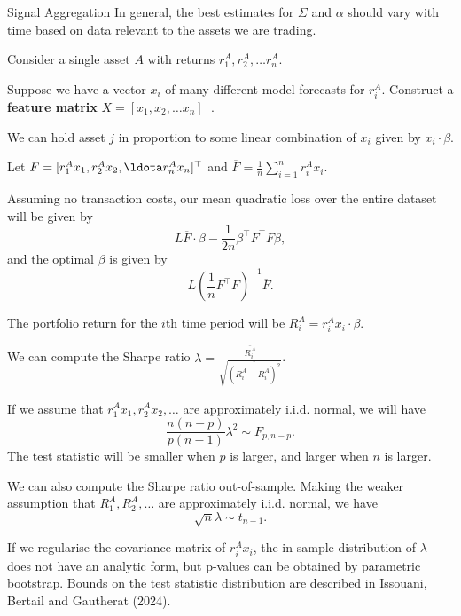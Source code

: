 \documentclass{beamer}
\begin{document}
\begin{frame}{Signal Aggregation}
	In general, the best estimates for $\Sigma$ and $\alpha$ should vary with time based on data relevant to the assets we are trading.

	Consider a single asset $A$ with returns $r_1^A,r_2^A,\ldots r_n^A$.

	Suppose we have a vector $x_i$ of many different model forecasts for $r_i^A$. Construct a \textbf{feature matrix} $X = [x_1,x_2,\ldots x_n]^\top$.

	We can hold asset $j$ in proportion to some linear combination of $x_i$ given by $x_i\cdot\beta$.

	Let $F=[r_1^A x_1, r_2^A x_2,\ldota r_n^A x_n]^\top$ and $\overline{F} = \frac{1}{n} \sum_{i=1}^n r_i^A x_i$.

	Assuming no transaction costs, our mean quadratic loss over the entire dataset will be given by
	$$L \overline{F} \cdot \beta - \frac{1}{2n}\beta^\top F^\top F\beta,$$
	and the optimal $\beta$ is given by
	$$L\left(\frac{1}{n}F^\top F\right)^{-1}\overline{F}.$$

	The portfolio return for the $i$th time period will be $R_i^A = r_i^A x_i \cdot \beta$.

	We can compute the Sharpe ratio $\lambda = \frac{\overline{R_i^A}}{\sqrt{\overline{(R_i^A - \overline{R_i^A})^2}}}$.

	If we assume that $r_1^A x_1,r_2^A x_2,\ldots$ are approximately i.i.d. normal, we will have
	$$\frac{n(n-p)}{p(n-1)}\lambda^2 \sim F_{p,n-p}.$$
	The test statistic will be smaller when $p$ is larger, and larger when $n$ is larger.%

	We can also compute the Sharpe ratio out-of-sample. Making the weaker assumption that $R_1^A,R_2^A,\ldots$ are approximately i.i.d. normal, we have
	$$\sqrt{n}\lambda \sim t_{n-1}.$$

	If we regularise the covariance matrix of $r_i^A x_i$, the in-sample distribution of $\lambda$ does not have an analytic form, but p-values can be obtained by parametric bootstrap. Bounds on the test statistic distribution are described in Issouani, Bertail and Gautherat (2024).

\end{frame}
\end{document}
